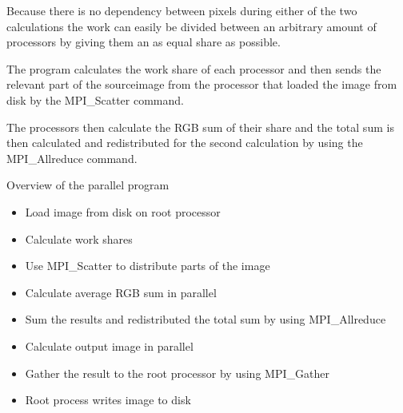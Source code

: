 \documentclass[a4paper,11pt]{article}
\begin{document}
Because there is no dependency between pixels during either of the two calculations the work can easily be divided between an arbitrary amount of processors by giving them an as equal share as possible. 

The program calculates the work share of each processor and then sends the relevant part of the sourceimage from the processor that loaded the image from disk by the MPI\_Scatter command. 

The processors then calculate the RGB sum of their share and the total sum is then calculated and redistributed for the second calculation by using the MPI\_Allreduce command.

Overview of the parallel program

\begin{itemize}
\renewcommand{\labelitemi}{$\bullet$}
\item Load image from disk on root processor
\item Calculate work shares
\item Use MPI\_Scatter to distribute parts of the image
\item Calculate average RGB sum in parallel
\item Sum the results and redistributed the total sum by using MPI\_Allreduce
\item Calculate output image in parallel
\item Gather the result to the root processor by using MPI\_Gather
\item Root process writes image to disk
\end{itemize}
\end{document}
